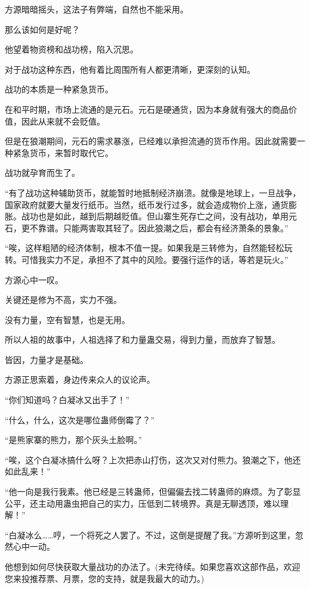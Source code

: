 \begin{this_body}
方源暗暗摇头，这法子有弊端，自然也不能采用。

那么该如何是好呢？

他望着物资榜和战功榜，陷入沉思。

对于战功这种东西，他有着比周围所有人都更清晰，更深刻的认知。

战功的本质是一种紧急货币。

在和平时期，市场上流通的是元石。元石是硬通货，因为本身就有强大的商品价值，因此从来就不会贬值。

但是在狼潮期间，元石的需求暴涨，已经难以承担流通的货币作用。因此就需要一种紧急货币，来暂时取代它。

战功就孕育而生了。

“有了战功这种辅助货币，就能暂时地抵制经济崩溃。就像是地球上，一旦战争，国家政府就要大量发行纸币。当然，纸币发行过多，就会造成物价上涨，通货膨胀。战功也是如此，越到后期越贬值。但山寨生死存亡之间，没有战功，单用元石，更不靠谱。只能两害取其轻了。因此狼潮之后，都会有经济萧条的景象。”

“唉，这样粗陋的经济体制，根本不值一提。如果我是三转修为，自然能轻松玩转。可惜我实力不足，承担不了其中的风险。要强行运作的话，等若是玩火。”

方源心中一叹。

关键还是修为不高，实力不强。

没有力量，空有智慧，也是无用。

所以人祖的故事中，人祖选择了和力量蛊交易，得到力量，而放弃了智慧。

皆因，力量才是基础。

方源正思索着，身边传来众人的议论声。

“你们知道吗？白凝冰又出手了！”

“什么，什么，这次是哪位蛊师倒霉了？”

“是熊家寨的熊力，那个灰头土脸啊。”

“唉，这个白凝冰搞什么呀？上次把赤山打伤，这次又对付熊力。狼潮之下，他还如此乱来！”

“他一向是我行我素。他已经是三转蛊师，但偏偏去找二转蛊师的麻烦。为了彰显公平，还主动用蛊虫把自己的实力，压低到二转境界。真是无聊透顶，难以理解！”

“白凝冰么……哼，一个将死之人罢了。不过，这倒是提醒了我。”方源听到这里，忽然心中一动。

他想到如何尽快获取大量战功的办法了。(未完待续。如果您喜欢这部作品，欢迎您来投推荐票、月票，您的支持，就是我最大的动力。)

\end{this_body}

